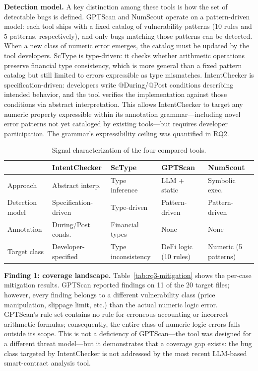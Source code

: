 \documentclass[pdflatex,sn-basic]{sn-jnl}%
\theoremstyle{thmstyleone}%
\theoremstyle{thmstyletwo}%
\theoremstyle{thmstylethree}%
\begin{document}
\smallskip
\noindent\textbf{Detection model.}
A key distinction among these tools is how the set of detectable bugs is defined.
GPTScan and NumScout operate on a pattern-driven model: each tool ships with a fixed catalog of vulnerability patterns (10 rules and 5 patterns, respectively), and only bugs matching those patterns can be detected.
When a new class of numeric error emerges, the catalog must be updated by the tool developers.
ScType is type-driven: it checks whether arithmetic operations preserve financial type consistency, which is more general than a fixed pattern catalog but still limited to errors expressible as type mismatches.
IntentChecker is specification-driven: developers write @During/@Post conditions describing intended behavior, and the tool verifies the implementation against those conditions via abstract interpretation.
This allows IntentChecker to target any numeric property expressible within its annotation grammar---including novel error patterns not yet cataloged by existing tools---but requires developer participation.
The grammar's expressibility ceiling was quantified in RQ2.

\begin{table}[t]
\centering
\caption{Signal characterization of the four compared tools.}
\label{tab:rq3-signal}
\small
\begin{tabular}{@{}lllll@{}}
\toprule
 & IntentChecker & ScType & GPTScan & NumScout \\
\midrule
Approach & Abstract interp. & Type inference & LLM + static & Symbolic exec. \\
Detection model & Specification-driven & Type-driven & Pattern-driven & Pattern-driven \\
Annotation & During/Post conds. & Financial types & None & None \\
Target class & Developer-specified & Type inconsistency & DeFi logic (10 rules) & Numeric (5 patterns) \\
\bottomrule
\end{tabular}
\end{table}

\smallskip
\noindent\textbf{Finding 1: coverage landscape.}
Table~\ref{tab:rq3-mitigation} shows the per-case mitigation results.
GPTScan reported findings on 11 of the 20 target files; however, every finding belongs to a different vulnerability class (price manipulation, slippage limit, etc.) than the actual numeric logic error.
GPTScan's rule set contains no rule for erroneous accounting or incorrect arithmetic formulas; consequently, the entire class of numeric logic errors falls outside its scope.
This is not a deficiency of GPTScan---the tool was designed for a different threat model---but it demonstrates that a coverage gap exists: the bug class targeted by IntentChecker is not addressed by the most recent LLM-based smart-contract analysis tool.
\end{document}

